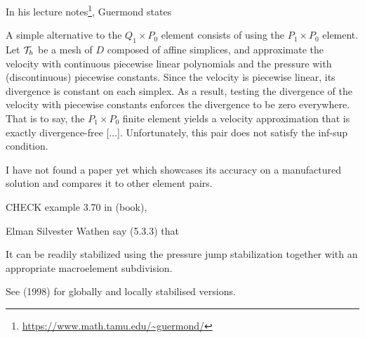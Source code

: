 
In his lecture notes\footnote{\url{https://www.math.tamu.edu/~guermond/}}, 
Guermond states 
\begin{displayquote}
{\color{darkgray}
A simple alternative to the 
$Q_1\times P_0$ element consists of using the $P_1\times P_0$ element.
Let ${\cal T}_h$  be a mesh of $D$ composed of affine simplices, and approximate the 
velocity with continuous piecewise linear polynomials and the pressure with
(discontinuous) piecewise constants. Since the velocity is piecewise linear, its
divergence is constant on each simplex. As a result, testing the divergence
of the velocity with piecewise constants enforces the divergence to be zero
everywhere. That is to say, the $P_1\times P_0$ finite element yields a velocity 
approximation that is exactly divergence-free [...]. Unfortunately,
this pair does not satisfy the inf-sup condition.}
\end{displayquote}

I have not found a paper yet which showcases its accuracy on a manufactured solution
and compares it to other element pairs.

CHECK example 3.70 in \textcite{john16} (book),

Elman Silvester Wathen say (5.3.3) that 
\begin{displayquote}
{\color{darkgray}
It can be readily stabilized using the pressure jump
stabilization together with an appropriate macroelement subdivision.}
\end{displayquote}
See \textcite{nosi98} (1998) for globally and locally stabilised versions.



 
